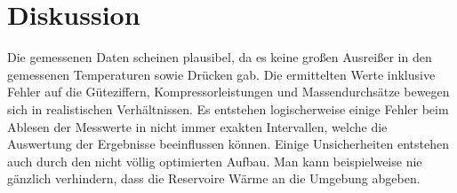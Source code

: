 \section{Diskussion}
Die gemessenen Daten scheinen plausibel, da es keine großen Ausreißer in den gemessenen Temperaturen
sowie Drücken gab. Die ermittelten Werte inklusive Fehler auf die Güteziffern, Kompressorleistungen und Massendurchsätze 
bewegen sich in realistischen Verhältnissen. 
Es entstehen logischerweise einige Fehler beim Ablesen der Messwerte in nicht immer exakten Intervallen, welche die 
Auswertung der Ergebnisse beeinflussen können.
Einige Unsicherheiten entstehen auch durch den nicht völlig optimierten Aufbau. Man kann beispielweise nie gänzlich
verhindern, dass die Reservoire Wärme an die Umgebung abgeben. 
